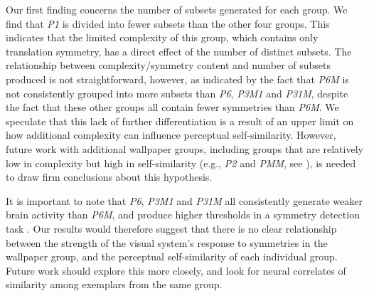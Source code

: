 \documentclass[symmetry,article,accept,pdftex,moreauthors]{Definitions/mdpi}
\begin{document}
Our first finding concerns the number of subsets generated for each group. We find that \textit{P1} is divided into fewer subsets than the other four groups. This indicates that the limited complexity of this group, which contains only translation symmetry, has a direct effect of the number of distinct subsets. The relationship between complexity/symmetry content and number of subsets produced is not straightforward, however, as indicated by the fact that \textit{P6M} is not consistently grouped into more subsets than \textit{P6}, \textit{P3M1} and \textit{P31M}, despite the fact that these other groups all contain fewer symmetries than \textit{P6M}. We speculate that this lack of further differentiation is a result of an upper limit on how additional complexity can influence perceptual self-similarity. However, future work with additional wallpaper groups, including groups that are relatively low in complexity but high in %
 self-similarity (e.g., \textit{P2} and \textit{PMM}, see \citep{RN172}), is needed to draw firm conclusions about this hypothesis.

It is important to note that \textit{P6}, \textit{P3M1} and \textit{P31M} all consistently generate weaker brain activity than \textit{P6M}, and produce higher thresholds in a symmetry detection task \citep{kohler_clarke_2021}. Our results would therefore suggest that there is no clear relationship between the strength of the visual system's response to symmetries in the wallpaper group, and the perceptual self-similarity of each individual group. Future work should explore this more closely, and look for neural correlates of similarity among exemplars from the same group.
\end{document}
